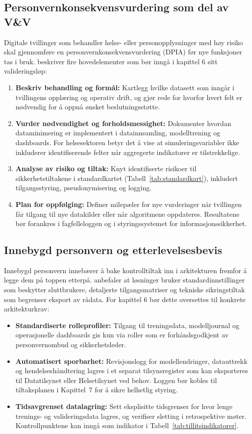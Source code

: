 \subsection{Personvernkonsekvensvurdering som del av V\&V}
Digitale tvillinger som behandler helse- eller personopplysninger med høy risiko skal gjennomføre en personvernkonsekvensvurdering (DPIA) før nye funksjoner tas i bruk. \citet{datatilsynet2023dpia} beskriver fire hovedelementer som bør inngå i kapittel 6 sitt valideringsløp:
\begin{enumerate}
    \item \textbf{Beskriv behandling og formål:} Kartlegg hvilke datasett som inngår i tvillingens opplæring og operativ drift, og gjør rede for hvorfor hvert felt er nødvendig for å oppnå ønsket beslutningsstøtte.
    \item \textbf{Vurder nødvendighet og forholdsmessighet:} Dokumenter hvordan dataminimering er implementert i datainnsamling, modelltrening og dashboards. For helsesektoren betyr det å vise at simuleringsvariabler ikke inkluderer identifiserende felter når aggregerte indikatorer er tilstrekkelige.
    \item \textbf{Analyse av risiko og tiltak:} Knyt identifiserte risikoer til sikkerhetstiltakene i standardkartet (Tabell~\ref{tab:standardkart}), inkludert tilgangsstyring, pseudonymisering og logging.
    \item \textbf{Plan for oppfølging:} Definer milepæler for nye vurderinger når tvillingen får tilgang til nye datakilder eller når algoritmene oppdateres. Resultatene bør forankres i fagfelleloggen og i styringssystemet for informasjonssikkerhet.
\end{enumerate}

\subsection{Innebygd personvern og etterlevelsesbevis}
Innebygd personvern innebærer å bake kontrolltiltak inn i arkitekturen fremfor å legge dem på toppen etterpå. \citet{datatilsynet2022innebygd} anbefaler at løsninger bruker standardinnstillinger som beskytter sluttbrukere, detaljerte tilgangsmatriser og tekniske sikringstiltak som begrenser eksport av rådata. For kapittel 6 bør dette oversettes til konkrete arkitekturkrav:
\begin{itemize}
    \item \textbf{Standardiserte rolleprofiler:} Tilgang til treningsdata, modelljournal og operasjonelle dashboards gis kun via roller som er forhåndsgodkjent av personvernombud og sikkerhetsleder.
    \item \textbf{Automatisert sporbarhet:} Revisjonslogg for modellendringer, datauttrekk og hendelseshåndtering lagres i et separat tilsynsregister som kan eksporteres til Datatilsynet eller Helsetilsynet ved behov. Loggen bør kobles til tiltaksplanen i Kapittel~7 for å sikre helhetlig styring.
    \item \textbf{Tidsavgrenset datalagring:} Sett eksplisitte tidsgrenser for hvor lenge trenings- og valideringsdata lagres, og verifiser sletting i retrospektive møter. Kontrollpunktene kan inngå som indikator i Tabell~\ref{tab:tillitsindikatorer}.
\end{itemize}

